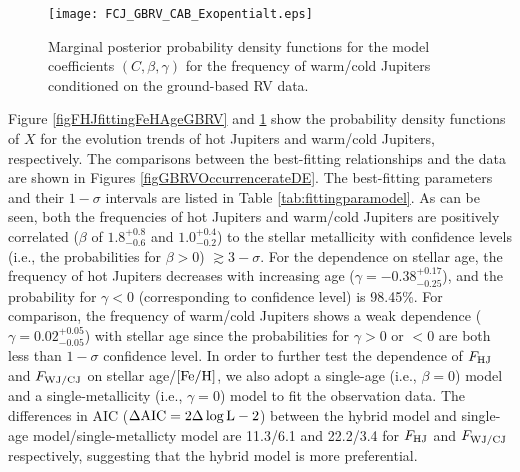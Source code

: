 \documentclass[twocolumn]{pnas-new}
\begin{document}
\begin{figure}[!t]
\centering
\texttt{[image: FCJ\_GBRV\_CAB\_Exopentialt.eps]}
\caption{Marginal posterior probability density functions for the model coefficients $(C, \beta, \gamma)$ for the frequency of warm/cold Jupiters conditioned on the ground-based RV data.
\label{figFCJfittingFeHAgeGBRV}}
\end{figure}


Figure \ref{figFHJfittingFeHAgeGBRV} and \ref{figFCJfittingFeHAgeGBRV} show the probability density functions of $X$ for the evolution trends of hot Jupiters and warm/cold Jupiters, respectively.
The comparisons between the best-fitting relationships and
the data are shown in Figures \ref{figGBRVOccurrencerateDE}.
The best-fitting parameters and their $1-\sigma$ intervals are listed in Table \ref{tab:fittingparamodel}.
As can be seen, both the frequencies of hot Jupiters and warm/cold Jupiters are positively correlated ($\beta$ of $1.8^{+0.8}_{-0.6}$ and $1.0^{+0.4}_{-0.2}$) to the stellar metallicity with confidence levels (i.e., the probabilities for $\beta>0$) $\gtrsim 3-\sigma$.
For the dependence on stellar age, the frequency of hot Jupiters decreases with increasing age ($\gamma = -0.38^{+0.17}_{-0.25}$), and the probability for $\gamma<0$ (corresponding to confidence level) is 98.45\%.
For comparison, the frequency of warm/cold Jupiters shows a weak dependence ($\gamma = 0.02^{+0.05}_{-0.05}$) with stellar age since the probabilities for $\gamma>0$ or $<0$ are both less than $1-\sigma$ confidence level.
In order to further test the dependence of $F_{\rm HJ}$ and $F_{\rm WJ/CJ}$ on stellar age/$\rm [Fe/H]$, we also adopt a single-age (i.e., $\beta = 0$) model and a single-metallicity (i.e., $\gamma = 0$) model to fit the observation data.
The differences in AIC ($\rm \Delta AIC = 2 \Delta \log L - 2$) between the hybrid model and single-age model/single-metallicty model are 11.3/6.1 and 22.2/3.4 for $F_{\rm HJ}$ and $F_{\rm WJ/CJ}$ respectively, suggesting that the hybrid model is more preferential. 
\end{document}

